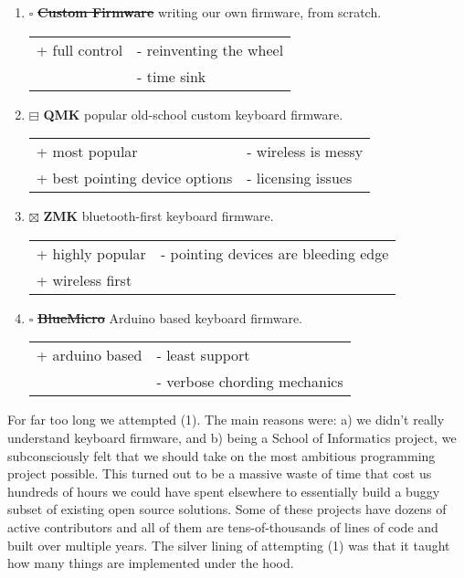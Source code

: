 \documentclass[logo,bsc,singlespacing,parskip]{infthesis}
\begin{document}
\begin{enumerate}
\item{$\square$} \sout{\textbf{Custom Firmware}} writing our own firmware, from scratch.
\begin{longtable}{|p{6.25cm}|p{6.25cm}|}
\hline
+ full control & - reinventing the wheel\\
 & - time sink\\
\hline
\end{longtable}

\item{$\boxminus$} \textbf{QMK} \autocite{QMKFirmware} popular old-school custom keyboard firmware.
\begin{longtable}{|p{6.25cm}|p{6.25cm}|}
\hline
+ most popular & - wireless is messy\\
+ best pointing device options & - licensing issues\\
\hline
\end{longtable}

\item{$\boxtimes$} \textbf{ZMK} \autocite{ZMKFirmware}  bluetooth-first keyboard firmware.
\begin{longtable}{|p{6.25cm}|p{6.25cm}|}
\hline
+ highly popular & - pointing devices are bleeding edge\\
+ wireless first & \\
\hline
\end{longtable}

\item{$\square$} \sout{\textbf{BlueMicro}} \autocite{constantineauBlueMicroFirmware2022} Arduino based keyboard firmware.
\begin{longtable}{|p{6.25cm}|p{6.25cm}|}
\hline
+ arduino based & - least support\\
 & - verbose chording mechanics\\
\hline
\end{longtable}
\end{enumerate}

For far too long we attempted (1).
The main reasons were: a) we didn't really understand keyboard firmware, and b) being a School of Informatics project, we subconsciously felt that we should take on the most ambitious programming project possible.
This turned out to be a massive waste of time that cost us hundreds of hours we could have spent elsewhere to essentially build a buggy subset of existing open source solutions.
Some of these projects have dozens of active contributors and all of them are tens-of-thousands of lines of code and built over multiple years.
The silver lining of attempting (1) was that it taught how many things are implemented under the hood.
\end{document}
